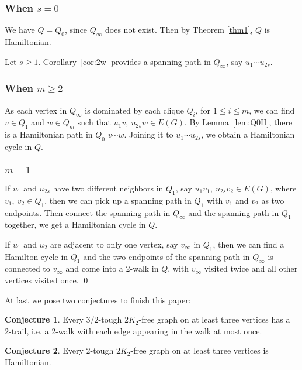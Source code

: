 \documentclass{amsart}
\theoremstyle{definition}
\newtheorem{conjecture}{Conjecture}
\begin{document}
\subsubsection{When $s=0$}
We have $Q=Q_0$, since $Q_{\infty}$ does not exist. Then by Theorem \ref{thm1}, $Q$ is Hamiltonian.
 
Let $s\geq 1$. Corollary~\ref{cor:2w} provides 
a spanning path in $Q_{\infty}$, say $u_1\cdots u_{2s}$. 

\subsubsection{When $m\ge2$}
As each vertex in $Q_{\infty}$ is dominated by each clique $Q_i$, for $1\le i\le m$, we
can find $v\in Q_1$ and $w\in Q_m$ such that
$u_1v,~u_{2s}w\in E(G)$. By Lemma~\ref{lem:Q0H}, there is a Hamiltonian path in $Q_0$
 $v\cdots w$. Joining it to $u_1\cdots u_{2s}$, we obtain a Hamiltonian cycle in $Q$.
 
\subsubsection{$m=1$}
If $u_1$ and $u_{2s}$ have two different neighbors in $Q_1$, say $u_1v_1,~u_{2s}v_2\in E(G)$, where $v_1,~v_2\in Q_1$, then we can pick up a spanning path in $Q_1$ with $v_1$ and $v_2$ as two endpoints. Then connect the spanning path in $Q_{\infty}$ and the spanning path in $Q_1$ together, we get a Hamiltonian cycle in $Q$.

If $u_1$ and $u_2$ are adjacent to only one vertex, say $v_{\infty}$ in $Q_1$, then we can find a Hamilton cycle in $Q_1$ and the two endpoints of the spanning path in $Q_{\infty}$ is connected to $v_{\infty}$ and come into a 2-walk in $Q$, with $v_{\infty}$ visited twice and all other vertices visited once. 
\qed



At last we pose two conjectures to finish this paper:


\begin{conjecture}
Every $3/2$-tough $2K_2$-free graph on at least three vertices has a 2-trail, i.e. a 2-walk with each edge appearing in the walk at most once.
\end{conjecture}


\begin{conjecture}
Every 2-tough $2K_2$-free graph on at least three vertices is Hamiltonian.
\end{conjecture}



\end{document}
